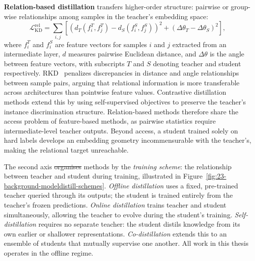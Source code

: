 \documentclass[12pt, a4paper, twoside]{book}
\makeatletter
\numberwithin{equation}{chapter}
\theoremstyle{plain}
\theoremstyle{definition}
\theoremstyle{remark}
\newenvironment{foldable}{}{}
\providecommand{\DIFaddtex}[1]{{\protect\color{blue}\uwave{#1}}} %
\providecommand{\DIFdeltex}[1]{{\protect\color{red}\sout{#1}}} %
\providecommand{\DIFaddbegin}{} %
\providecommand{\DIFaddend}{} %
\providecommand{\DIFdelbegin}{} %
\providecommand{\DIFdelend}{} %
\providecommand{\DIFadd}[1]{\texorpdfstring{\DIFaddtex{#1}}{#1}} %
\providecommand{\DIFdel}[1]{\texorpdfstring{\DIFdeltex{#1}}{}} %
\newcommand{\DIFscaledelfig}{0.5}
\newlength{\DIFdelgraphicswidth} %
\newlength{\DIFdelgraphicsheight} %
\newcommand{\DIFaddincludegraphics}[2][]{{\color{blue}\fbox{\DIFOincludegraphics[#1]{#2}}}} %
\newcommand{\DIFdelincludegraphics}[2][]{%
\sbox{\DIFdelgraphicsbox}{\DIFOincludegraphics[#1]{#2}}%
\settoboxwidth{\DIFdelgraphicswidth}{\DIFdelgraphicsbox} %
\settoboxtotalheight{\DIFdelgraphicsheight}{\DIFdelgraphicsbox} %
\scalebox{\DIFscaledelfig}{%
\parbox[b]{\DIFdelgraphicswidth}{\usebox{\DIFdelgraphicsbox}\\[-\baselineskip] \rule{\DIFdelgraphicswidth}{0em}}\llap{\resizebox{\DIFdelgraphicswidth}{\DIFdelgraphicsheight}{%
\setlength{\unitlength}{\DIFdelgraphicswidth}%
\begin{picture}(1,1)%
\thicklines\linethickness{2pt} %
{\color[rgb]{1,0,0}\put(0,0){\framebox(1,1){}}}%
{\color[rgb]{1,0,0}\put(0,0){\line( 1,1){1}}}%
{\color[rgb]{1,0,0}\put(0,1){\line(1,-1){1}}}%
\end{picture}%
}\hspace*{3pt}}} %
} %
\DeclareRobustCommand{\DIFaddbegin}{\DIFOaddbegin \let\includegraphics\DIFaddincludegraphics} %
\DeclareRobustCommand{\DIFaddend}{\DIFOaddend \let\includegraphics\DIFOincludegraphics} %
\DeclareRobustCommand{\DIFdelbegin}{\DIFOdelbegin \let\includegraphics\DIFdelincludegraphics} %
\DeclareRobustCommand{\DIFdelend}{\DIFOaddend \let\includegraphics\DIFOincludegraphics} %
\let\sout@orig\sout %
\renewcommand{\sout}[1]{\ifmmode\text{\sout@orig{\ensuremath{#1}}}\else\sout@orig{#1}\fi} %
\makeatother
\begin{document}
\begin{foldable}
  \textbf{Relation-based distillation} transfers higher-order structure: pairwise or group-wise relationships among samples in the teacher's embedding space:
  \begin{equation}
    \mathcal{L}_{\text{KD}}^{\text{rel}} = \sum_{i,j} \left[ (d_T(f_i^T, f_j^T) - d_S(f_i^S, f_j^S))^2 + (\Delta\theta_T - \Delta\theta_S)^2 \right],
    \label{eq:kd-relation}
  \end{equation}
  where $f_i^T$ and $f_i^S$ are feature vectors for samples $i$ and $j$ extracted from an intermediate layer, $d$ measures pairwise Euclidean distance, and $\Delta\theta$ is the angle between feature vectors, with subscripts $T$ and $S$ denoting teacher and student respectively.
  RKD~\cite{park2019relational} penalizes discrepancies in distance and angle relationships between sample pairs, arguing that relational information is more transferable across architectures than pointwise feature values.
  Contrastive distillation methods extend this by using self-supervised objectives to preserve the teacher's instance discrimination structure.
  Relation-based methods therefore share the access problem of feature-based methods, as pairwise statistics require intermediate-level teacher outputs.
  Beyond access, a student trained solely on hard labels develops an embedding geometry incommensurable with the teacher's, making the relational target unreachable.
\end{foldable}

\begin{foldable}
  The second axis \DIFdelbegin \DIFdel{organises }\DIFdelend \DIFaddbegin \DIFadd{organizes }\DIFaddend methods by the \textit{training scheme}: the relationship between teacher and student during training, illustrated in Figure~\ref{fig:23-background-modeldistill-schemes}.
  \textit{Offline distillation} uses a fixed, pre-trained teacher queried through its outputs; the student is trained entirely from the teacher's frozen predictions.
  \textit{Online distillation} trains teacher and student simultaneously, allowing the teacher to evolve during the student's training.
  \textit{Self-distillation} requires no separate teacher: the student distils knowledge from its own earlier or shallower representations.
  \textit{Co-distillation} extends this to an ensemble of students that mutually supervise one another.
  All work in this thesis operates in the offline regime.
\end{foldable}
\end{document}
